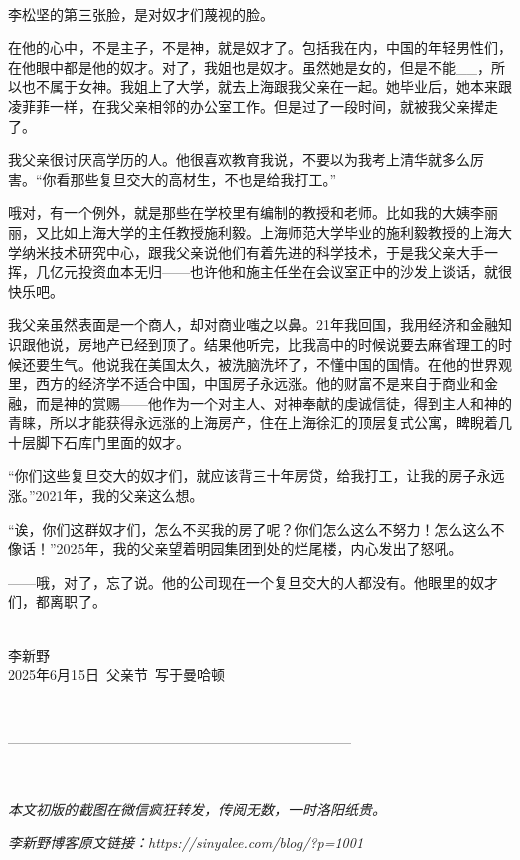 \ 

李松坚的第三张脸，是对奴才们蔑视的脸。

在他的心中，不是主子，不是神，就是奴才了。包括我在内，中国的年轻男性们，在他眼中都是他的奴才。对了，我姐也是奴才。虽然她是女的，但是不能\_\_，所以也不属于女神。我姐上了大学，就去上海跟我父亲在一起。她毕业后，她本来跟凌菲菲一样，在我父亲相邻的办公室工作。但是过了一段时间，就被我父亲撵走了。

我父亲很讨厌高学历的人。他很喜欢教育我说，不要以为我考上清华就多么厉害。``你看那些复旦交大的高材生，不也是给我打工。''

哦对，有一个例外，就是那些在学校里有编制的教授和老师。比如我的大姨李丽丽，又比如上海大学的主任教授施利毅。上海师范大学毕业的施利毅教授的上海大学纳米技术研究中心，跟我父亲说他们有着先进的科学技术，于是我父亲大手一挥，几亿元投资血本无归——也许他和施主任坐在会议室正中的沙发上谈话，就很快乐吧。

我父亲虽然表面是一个商人，却对商业嗤之以鼻。21年我回国，我用经济和金融知识跟他说，房地产已经到顶了。结果他听完，比我高中的时候说要去麻省理工的时候还要生气。他说我在美国太久，被洗脑洗坏了，不懂中国的国情。在他的世界观里，西方的经济学不适合中国，中国房子永远涨。他的财富不是来自于商业和金融，而是神的赏赐——他作为一个对主人、对神奉献的虔诚信徒，得到主人和神的青睐，所以才能获得永远涨的上海房产，住在上海徐汇的顶层复式公寓，睥睨着几十层脚下石库门里面的奴才。

``你们这些复旦交大的奴才们，就应该背三十年房贷，给我打工，让我的房子永远涨。''2021年，我的父亲这么想。

``诶，你们这群奴才们，怎么不买我的房了呢？你们怎么这么不努力！怎么这么不像话！''2025年，我的父亲望着明园集团到处的烂尾楼，内心发出了怒吼。

——哦，对了，忘了说。他的公司现在一个复旦交大的人都没有。他眼里的奴才们，都离职了。

\ \\李新野\\
2025年6月15日\ 父亲节\ 写于曼哈顿


\ 

--------------------------------------------------------------------------

\ 

\textit{本文初版的截图在微信疯狂转发，传阅无数，一时洛阳纸贵。}

\textit{李新野博客原文链接：https://sinyalee.com/blog/?p=1001}
